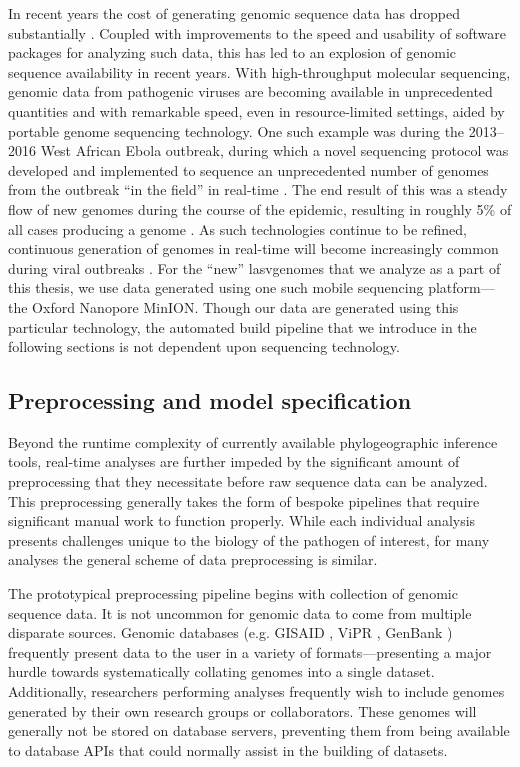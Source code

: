 In recent years the cost of generating genomic sequence data has dropped substantially \cite{sboner2011real}.
Coupled with improvements to the speed and usability of software packages for analyzing such data, this has led to an explosion of genomic sequence availability in recent years.
With high-throughput molecular sequencing, genomic data from pathogenic viruses are becoming available in unprecedented quantities and with remarkable speed, even in resource-limited settings, aided by portable genome sequencing technology.
One such example was during the 2013--2016 West African Ebola outbreak, during which a novel sequencing protocol was developed and implemented to sequence an unprecedented number of genomes from the outbreak ``in the field'' in real-time \cite{quick2016real}.
The end result of this was a steady flow of new genomes during the course of the epidemic, resulting in roughly 5\% of all cases producing a genome \cite{dudas2017virus}.
As such technologies continue to be refined, continuous generation of genomes in real-time will become increasingly common during viral outbreaks \cite{jain2016oxford}.
For the ``new'' \gls{lasv}genomes that we analyze as a part of this thesis, we use data generated using one such mobile sequencing platform---the Oxford Nanopore MinION.
Though our data are generated using this particular technology, the automated build pipeline that we introduce in the following sections is not dependent upon sequencing technology.

\subsection{Preprocessing and model specification}

Beyond the runtime complexity of currently available phylogeographic inference tools, real-time analyses are further impeded by the significant amount of preprocessing that they necessitate before raw sequence data can be analyzed. %
This preprocessing generally takes the form of bespoke pipelines that require significant manual work to function properly.
While each individual analysis presents challenges unique to the biology of the pathogen of interest, for many analyses the general scheme of data preprocessing is similar.

The prototypical preprocessing pipeline begins with collection of genomic sequence data.
It is not uncommon for genomic data to come from multiple disparate sources.
Genomic databases (e.g. GISAID \cite{shu2017gisaid}, ViPR \cite{pickett2012vipr}, GenBank \cite{benson2012genbank}) frequently present data to the user in a variety of formats---presenting a major hurdle towards systematically collating genomes into a single dataset.
Additionally, researchers performing analyses frequently wish to include genomes generated by their own research groups or collaborators.
These genomes will generally not be stored on database servers, preventing them from being available to database APIs that could normally assist in the building of datasets.

